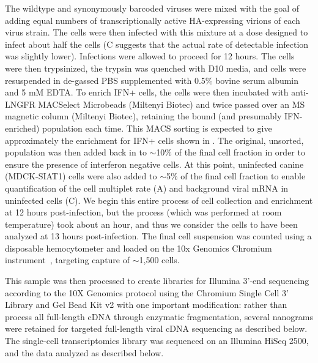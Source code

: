 \documentclass[9pt,lineno]{elife}
\begin{document}
The wildtype and synonymously barcoded viruses were mixed with the goal of adding equal numbers of transcriptionally active HA-expressing virions of each virus strain.
The cells were then infected with this mixture at a dose designed to infect about half the cells (C suggests that the actual rate of detectable infection was slightly lower).
Infections were allowed to proceed for 12 hours.
The cells were then trypsinized, the trypsin was quenched with D10 media, and cells were resuspended in de-gassed PBS supplemented with 0.5\% bovine serum albumin and 5 mM EDTA. 
To enrich IFN+ cells, the cells were then incubated with anti-LNGFR MACSelect Microbeads (Miltenyi Biotec) and twice passed over an MS magnetic column (Miltenyi Biotec), retaining the bound (and presumably IFN-enriched) population each time. 
This MACS sorting is expected to give approximately the enrichment for IFN+ cells shown in .
The original, unsorted, population was then added back in to $\sim$10\% of the final cell fraction in order to ensure the presence of interferon negative cells. 
At this point, uninfected canine (MDCK-SIAT1) cells were also added to $\sim$5\% of the final cell fraction to enable quantification of the cell multiplet rate (A) and background viral mRNA in uninfected cells (C). 
We begin this entire process of cell collection and enrichment at 12 hours post-infection, but the process (which was performed at room temperature) took about an hour, and thus we consider the cells to have been analyzed at 13 hours post-infection.
The final cell suspension was counted using a disposable hemocytometer and loaded on the 10x Genomics Chromium instrument~\citep{zheng2017massively}, targeting capture of $\sim$1,500 cells. 

This sample was then processed to create libraries for Illumina 3'-end sequencing according to the 10X Genomics protocol using the Chromium Single Cell 3' Library and Gel Bead Kit v2 with one important modification: rather than process all full-length cDNA through enzymatic fragmentation, several nanograms were retained for targeted full-length viral cDNA sequencing as described below.
The single-cell transcriptomics library was sequenced on an Illumina HiSeq 2500, and the data analyzed as described below.
\end{document}
